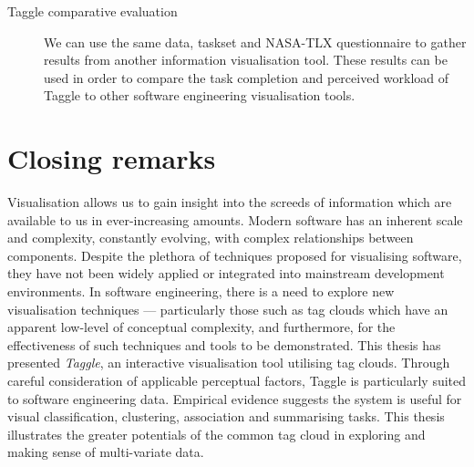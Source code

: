 \begin{description}
	\item [Taggle comparative evaluation] We can use the same data, taskset and NASA-TLX questionnaire to gather results from another information visualisation tool. These results can be used in order to compare the task completion and perceived workload of Taggle to other software engineering visualisation tools.

\end{description}

\section{Closing remarks}

Visualisation allows us to gain insight into the screeds of information which are available to us in ever-increasing amounts. Modern software has an inherent scale and complexity, constantly evolving, with complex relationships between components. Despite the plethora of techniques proposed for visualising software, they have not been widely applied or integrated into mainstream development environments. In software engineering, there is a need to explore new visualisation techniques --- particularly those such as tag clouds which have an apparent low-level of conceptual complexity, and furthermore, for the effectiveness of such techniques and tools to be demonstrated. This thesis has presented \emph{Taggle}, an interactive visualisation tool utilising tag clouds. Through careful consideration of applicable perceptual factors, Taggle is particularly suited to software engineering data. Empirical evidence suggests the system is useful for visual classification, clustering, association and summarising tasks. This thesis illustrates the greater potentials of the common tag cloud in exploring and making sense of multi-variate data. 



